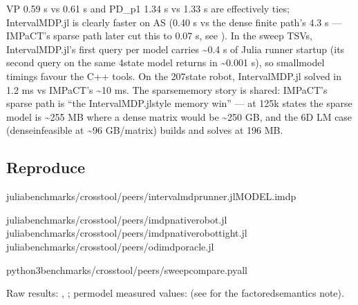 \documentclass[a4paper,10pt,english]{sphinxmanual}
\begin{document}
\sphinxAtStartPar
VP 0.59 s vs 0.61 s and PD\_p1 1.34 s vs 1.33 s are effectively ties; IntervalMDP.jl is
clearly faster on AS (0.40 s vs the dense finite path’s 4.3 s — IMPaCT’s sparse path
later cut this to 0.07 s, see ). In the sweep TSVs,
IntervalMDP.jl’s first query per model carries \textasciitilde{}0.4 s of Julia runner start\sphinxhyphen{}up (its
second query on the same 4\sphinxhyphen{}state model returns in \textasciitilde{}0.001 s), so small\sphinxhyphen{}model timings
favour the C++ tools. On the 207\sphinxhyphen{}state robot, IntervalMDP.jl solved in 1.2 ms vs
IMPaCT’s \textasciitilde{}10 ms. The sparse\sphinxhyphen{}memory story is shared: IMPaCT’s sparse path is “the
IntervalMDP.jl\sphinxhyphen{}style memory win” — at 125k states the sparse model is \textasciitilde{}255 MB where a
dense matrix would be \textasciitilde{}250 GB, and the 6\sphinxhyphen{}D LM case (dense\sphinxhyphen{}infeasible at \textasciitilde{}96 GB/matrix)
builds and solves at 196 MB.


\subsection{Reproduce}
\label{\detokenize{comparison/impact-vs-intervalmdp:reproduce}}
\begin{sphinxVerbatim}[commandchars=\\\{\}]
juliabenchmarks/crosstool/peers/intervalmdp\PYGZus{}runner.jlMODEL.imdp

juliabenchmarks/crosstool/peers/imdp\PYGZus{}native\PYGZus{}robot.jl
juliabenchmarks/crosstool/peers/imdp\PYGZus{}native\PYGZus{}robot\PYGZus{}tight.jl
juliabenchmarks/crosstool/peers/odimdp\PYGZus{}oracle.jl

python3benchmarks/crosstool/peers/sweep\PYGZus{}compare.pyall
\end{sphinxVerbatim}

\sphinxAtStartPar
Raw results: , ; per\sphinxhyphen{}model measured
values:  (see  for the
factored\sphinxhyphen{}semantics note).
\end{document}

